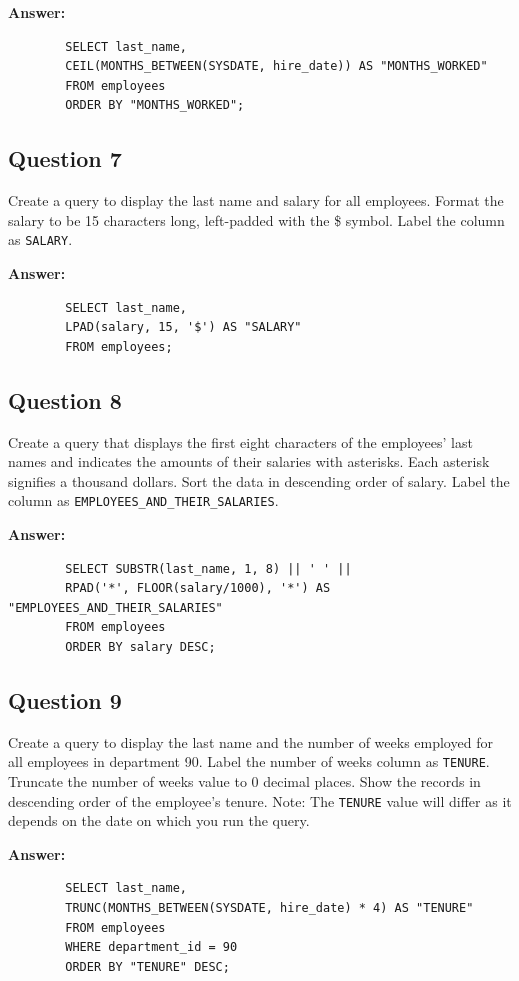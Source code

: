 \documentclass[12pt,a4paper]{article}
\begin{document}
\textbf{Answer:}
    \begin{lstlisting}
        SELECT last_name,
        CEIL(MONTHS_BETWEEN(SYSDATE, hire_date)) AS "MONTHS_WORKED"
        FROM employees
        ORDER BY "MONTHS_WORKED";
    \end{lstlisting}

\subsection*{Question 7}
Create a query to display the last name and salary for all employees. Format the salary to be 15 
characters long, left-padded with the \$ symbol. Label the column as \texttt{SALARY}.

\textbf{Answer:}
    \begin{lstlisting}
        SELECT last_name,
        LPAD(salary, 15, '$') AS "SALARY"
        FROM employees;
    \end{lstlisting}

\subsection*{Question 8}
Create a query that displays the first eight characters of the employees’ last names and indicates 
the amounts of their salaries with asterisks. Each asterisk signifies a thousand dollars. Sort the 
data in descending order of salary. Label the column as 
\texttt{EMPLOYEES\_AND\_THEIR\_SALARIES}.

\textbf{Answer:}
    \begin{lstlisting}
        SELECT SUBSTR(last_name, 1, 8) || ' ' ||
        RPAD('*', FLOOR(salary/1000), '*') AS "EMPLOYEES_AND_THEIR_SALARIES"
        FROM employees
        ORDER BY salary DESC;
    \end{lstlisting}

\subsection*{Question 9}
Create a query to display the last name and the number of weeks employed for all employees in 
department 90. Label the number of weeks column as \texttt{TENURE}. Truncate the number of weeks 
value to 0 decimal places. Show the records in descending order of the employee’s tenure.
Note: The \texttt{TENURE} value will differ as it depends on the date on which you run the query.

\textbf{Answer:}
    \begin{lstlisting}
        SELECT last_name,
        TRUNC(MONTHS_BETWEEN(SYSDATE, hire_date) * 4) AS "TENURE"
        FROM employees
        WHERE department_id = 90
        ORDER BY "TENURE" DESC;
    \end{lstlisting}
\end{document}
